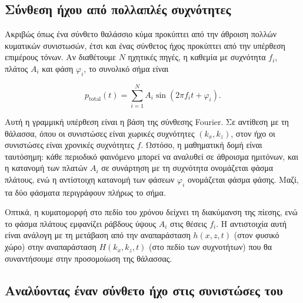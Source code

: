 \documentclass[a4paper, 11pt]{article}
\begin{document}
\subsection{Σύνθεση ήχου από πολλαπλές
συχνότητες}\label{ux3c3ux3cdux3bdux3b8ux3b5ux3c3ux3b7-ux3aeux3c7ux3bfux3c5-ux3b1ux3c0ux3cc-ux3c0ux3bfux3bbux3bbux3b1ux3c0ux3bbux3adux3c2-ux3c3ux3c5ux3c7ux3bdux3ccux3c4ux3b7ux3c4ux3b5ux3c2}

Ακριβώς όπως ένα σύνθετο θαλάσσιο κύμα προκύπτει από την άθροιση πολλών
κυματικών συνιστωσών, έτσι και ένας σύνθετος ήχος προκύπτει από την
υπέρθεση επιμέρους τόνων. Αν διαθέτουμε \(N\) ηχητικές πηγές, η καθεμία
με συχνότητα \(f_i\), πλάτος \(A_i\) και φάση \(\varphi_i\), το συνολικό
σήμα είναι

\[
p_{\text{total}}(t) = \sum_{i=1}^{N} A_i \sin(2\pi f_i t + \varphi_i).
\]

Αυτή η γραμμική υπέρθεση είναι η βάση της σύνθεσης Fourier. Σε αντίθεση
με τη θάλασσα, όπου οι συνιστώσες είναι χωρικές συχνότητες
\((k_x, k_z)\), στον ήχο οι συνιστώσες είναι χρονικές συχνότητες \(f\).
Ωστόσο, η μαθηματική δομή είναι ταυτόσημη: κάθε περιοδικό φαινόμενο
μπορεί να αναλυθεί σε άθροισμα ημιτόνων, και η κατανομή των πλατών
\(A_i\) σε συνάρτηση με τη συχνότητα ονομάζεται φάσμα πλάτους, ενώ η
αντίστοιχη κατανομή των φάσεων \(\varphi_i\) ονομάζεται φάσμα φάσης.
Μαζί, τα δύο φάσματα περιγράφουν πλήρως το σήμα.

Οπτικά, η κυματομορφή στο πεδίο του χρόνου δείχνει τη διακύμανση της
πίεσης, ενώ το φάσμα πλάτους εμφανίζει ράβδους ύψους \(A_i\) στις θέσεις
\(f_i\). Η αντιστοιχία αυτή είναι ανάλογη με τη μετάβαση από την
αναπαράσταση \(h(x,z,t)\) (στον φυσικό χώρο) στην αναπαράσταση
\(H(k_x,k_z,t)\) (στο πεδίο των συχνοτήτων) που θα συναντήσουμε στην
προσομοίωση της θάλασσας.

\subsection{Αναλύοντας έναν σύνθετο ήχο στις συνιστώσες
του}\label{ux3b1ux3bdux3b1ux3bbux3cdux3bfux3bdux3c4ux3b1ux3c2-ux3adux3bdux3b1ux3bd-ux3c3ux3cdux3bdux3b8ux3b5ux3c4ux3bf-ux3aeux3c7ux3bf-ux3c3ux3c4ux3b9ux3c2-ux3c3ux3c5ux3bdux3b9ux3c3ux3c4ux3ceux3c3ux3b5ux3c2-ux3c4ux3bfux3c5}
\end{document}
